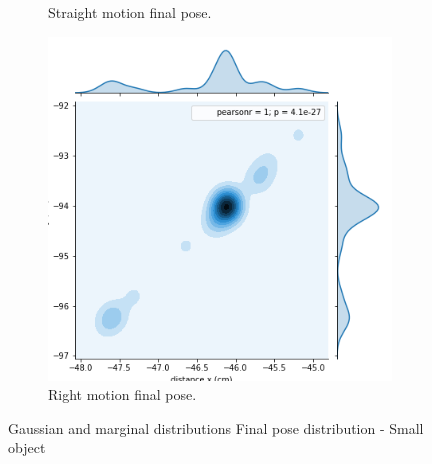 \begin{figure}[ht!]
\begin{subfigure}[b]{0.3\textwidth}
		\caption{Straight motion final pose.}
		\label{distribution-right-turn}
	\end{subfigure}
	\qquad
	\begin{subfigure}[b]{0.3\textwidth}
		\includegraphics[width=\textwidth]{images/small_right.png}
		\caption{Right motion final pose.}
		\label{distribution-straight-motion}
	\end{subfigure}
	\caption{Gaussian and marginal distributions Final pose distribution - Small object}
\end{figure}


